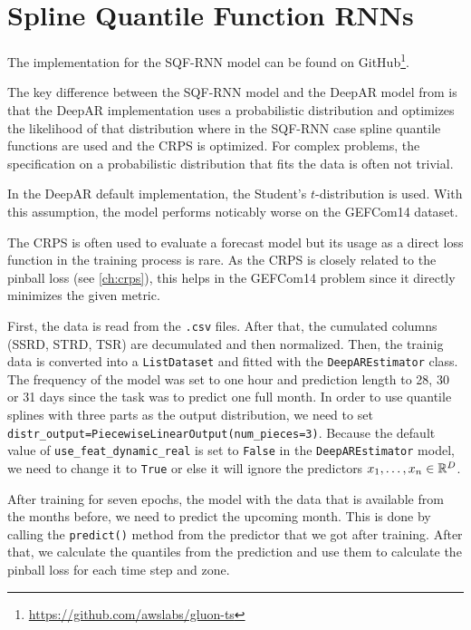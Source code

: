 \section{Spline Quantile Function RNNs}
\label{sec:implementation-sqf-rnn}

The implementation for the SQF-RNN model can be found on GitHub\footnote{\url{https://github.com/awslabs/gluon-ts}}.

The key difference between the SQF-RNN model and the DeepAR model from 
\Textcite{Salinas2017} is that the DeepAR implementation uses a 
probabilistic distribution and optimizes the likelihood of that distribution 
where in the SQF-RNN case spline quantile functions are used and the 
CRPS is optimized. 
For complex problems, the specification on a probabilistic distribution 
that fits the data is often not trivial. 

In the DeepAR default implementation, the Student's \(t\)-distribution is used. 
With this assumption, the model performs noticably worse on the GEFCom14 dataset.

The CRPS is often used to evaluate a forecast model but its usage as 
a direct loss function in the training process is rare. 
As the CRPS is closely related to the pinball loss (see \ref{ch:crps}), 
this helps in the GEFCom14 problem since it directly minimizes the given metric.

First, the data is read from the \texttt{.csv} files. 
After that, the cumulated columns (SSRD, STRD, TSR) are decumulated and then normalized.
Then, the trainig data is converted into a \texttt{ListDataset} and fitted with the 
\texttt{DeepAREstimator} class. The frequency of the model was set to one hour and 
prediction length to 28, 30 or 31 days since the task was to predict one full month. 
In order to use quantile splines with three parts as the output distribution, 
we need to set \texttt{distr\_output=PiecewiseLinearOutput(num\_pieces=3)}. 
Because the default value of \texttt{use\_feat\_dynamic\_real} is set to \texttt{False} 
in the \texttt{DeepAREstimator} model, 
we need to change it to \texttt{True} or else it will ignore the predictors 
\(x_1, \ldots, x_n \in \mathbb{R}^D\). 

After training for seven epochs, the model with the data that is available from the months before, 
we need to predict the upcoming month. This is done by calling the \texttt{predict()} 
method from the predictor that we got after training.
After that, we calculate the quantiles from the prediction and use them to 
calculate the pinball loss for each time step and zone.

